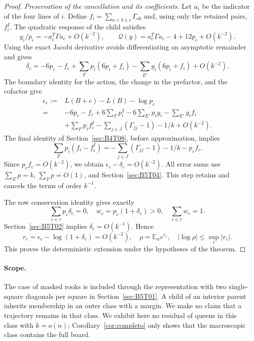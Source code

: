 \begin{proof}
\par\emph{Preservation of the cancellation and its coefficients.}
Let $a_i$ be the indicator of the four lines of $i$. Define
$f_i=\sum_{a<b\in i}\Gamma_{ab}$ and, using only the retained pairs, $f_i^I$.
The quadratic response of the child satisfies
\[
 y_i/p_i=-a_i^T\Gamma a_c+O(k^{-2}),\qquad
 \mathcal Q(y)=a_c^T\Gamma a_c-4+12p_c+O(k^{-2}).
\]
Using the exact Jacobi derivative avoids differentiating an asymptotic remainder and gives
\[
 \delta_c=-6p_c-f_c+\sum_Fp_i(6p_i+f_i)
             -\sum_{E'}y_i(6p_i+f_i)+O(k^{-2}).
\]
The boundary identity for the action, the change in the prefactor, and the cofactor give
\[
 \begin{aligned}
 \epsilon_c:={}&L(B+c)-L(B)-\log p_c\\
 ={}&-6p_c-f_c+6\sum_Fp_i^2-6\sum_{E'}p_iy_i-\sum_{E'}y_if_i\\
 &+\sum_Fp_if_i^I-\sum_{j\in J}(\Gamma_{jj}-1)-1/k+O(k^{-2}).
 \end{aligned}
\]
The final identity of Section~\ref{sec:B4T08}, before approximation, implies
\[
 \sum_Fp_i(f_i-f_i^I)
 =-\sum_{j\in J}(\Gamma_{jj}-1)-1/k-p_cf_c.
\]
Since $p_cf_c=O(k^{-2})$, we obtain $\epsilon_c-\delta_c=O(k^{-2})$.
All error sums use $\sum_Ep=k$, $\sum_Fp=O(1)$, and Section~\ref{sec:B5T04}.
This step retains and cancels the terms of order $k^{-1}$.

The row conservation identity gives exactly
\[
 \sum_{c\in r}p_c\delta_c=0,\quad
 w_c=p_c(1+\delta_c)>0,\quad\sum_{c\in r}w_c=1.
\]
Section~\ref{sec:B5T02} implies $\delta_c=O(k^{-1})$. Hence
\[
 r_c=\epsilon_c-\log(1+\delta_c)=O(k^{-2}),\quad
 \rho=\mathbb E_w e^{r_c},\quad|\log\rho|\le\sup_c|r_c|.
\]
This proves the deterministic extension under the hypotheses of the theorem.
\end{proof}

\paragraph{Scope.}
The case of masked rooks is included through the representation with two
single-square diagonals per square in Section~\ref{sec:B5T01}. A child of an interior parent inherits
membership in an outer class with a margin. We make no claim that a trajectory remains in that class. We
exhibit here no residual
of queens in this class with $k=o(n)$; Corollary~\ref{cor:completo} only shows that the macroscopic
class contains the full board.
